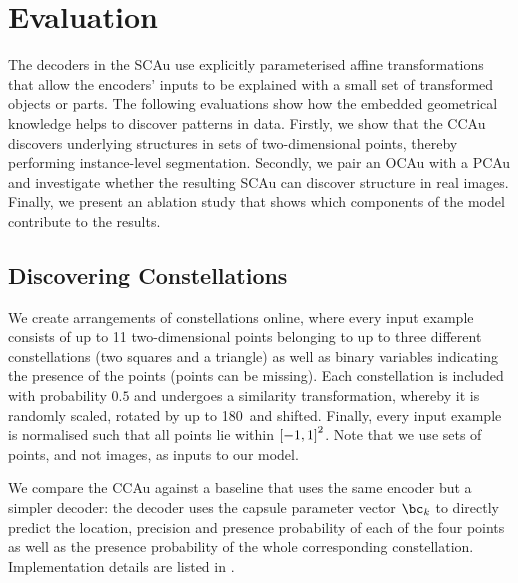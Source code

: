\section{Evaluation}
\label{sec:sca_experiments}

The decoders in the \gls{SCAu} use explicitly parameterised affine transformations
that allow the encoders’ inputs to be explained with a small set of transformed objects or parts. 
The following evaluations show how the embedded geometrical knowledge helps to discover patterns in data.
Firstly, we show that the \gls{CCAu} discovers underlying structures in sets of two-dimensional points, thereby performing instance-level segmentation.
Secondly, we pair an \gls{OCAu} with a \gls{PCAu} and investigate whether the resulting \gls{SCAu} can discover structure in real images.
Finally, we present an ablation study that shows which components of the model contribute to the results.

\subsection{Discovering Constellations}
\label{sec:constellation_expr}

We create arrangements of constellations online, where every input example consists of up to 11 two-dimensional points belonging to up to three different constellations (two squares and a triangle) as well as binary variables indicating the presence of the points (points can be missing).
Each constellation is included with probability $0.5$ and undergoes a similarity transformation, whereby it is randomly scaled, rotated by up to 180\textdegree\ and shifted.
Finally, every input example is normalised such that all points lie within ${\left[-1, 1\right]}^2$.
Note that we use sets of points, and not images, as inputs to our model.

We compare the \gls{CCAu} against a baseline that uses the same encoder but a simpler decoder: the decoder uses the capsule parameter vector $\bc_k$ to directly predict the location, precision and presence probability of each of the four points as well as the presence probability of the whole corresponding constellation. 
Implementation details are listed in 
.


